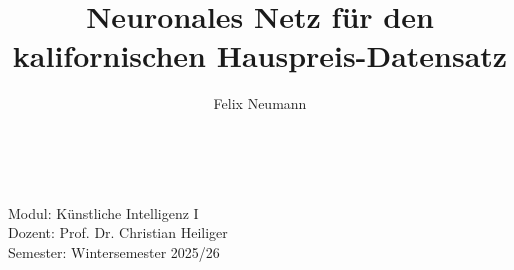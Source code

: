 \documentclass[9pt,a4paper,twocolumn,twoside]{tau-class/tau}
\begin{document}
\begin{titlepage}
\begin{minipage}{0.5\textwidth}
\begin{flushright}
        \end{flushright}
    \end{minipage}\\[2.0 cm]

        
    \begin{minipage}{0.8\textwidth}
       \begin{center}
        \large
        Modul: Künstliche Intelligenz I\\
        Dozent: Prof. Dr. Christian Heiliger\\
        Semester: Wintersemester 2025/26
        \end{center} 
    \end{minipage}

\vfill

\end{titlepage}

\tableofcontents
\newpage





\title{Neuronales Netz f\"ur den kalifornischen Hauspreis-Datensatz}

\author[a]{Felix Neumann}


\theday{\today}

\end{document}
